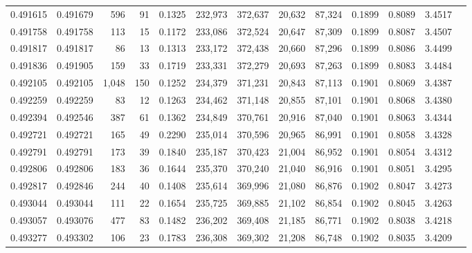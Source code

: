\begin{tabular}{rrrrrrrrrrrrr}
0.491615 & 0.491679 &   596 &    91 &                                     0.1325 & 232,973 & 372,637 &  20,632 &  87,324 & 0.1899 & 0.8089 & 3.4517 \\
0.491758 & 0.491758 &   113 &    15 &                                     0.1172 & 233,086 & 372,524 &  20,647 &  87,309 & 0.1899 & 0.8087 & 3.4507 \\
0.491817 & 0.491817 &    86 &    13 &                                     0.1313 & 233,172 & 372,438 &  20,660 &  87,296 & 0.1899 & 0.8086 & 3.4499 \\
0.491836 & 0.491905 &   159 &    33 &                                     0.1719 & 233,331 & 372,279 &  20,693 &  87,263 & 0.1899 & 0.8083 & 3.4484 \\
0.492105 & 0.492105 & 1,048 &   150 &                                     0.1252 & 234,379 & 371,231 &  20,843 &  87,113 & 0.1901 & 0.8069 & 3.4387 \\
0.492259 & 0.492259 &    83 &    12 &                                     0.1263 & 234,462 & 371,148 &  20,855 &  87,101 & 0.1901 & 0.8068 & 3.4380 \\
0.492394 & 0.492546 &   387 &    61 &                                     0.1362 & 234,849 & 370,761 &  20,916 &  87,040 & 0.1901 & 0.8063 & 3.4344 \\
0.492721 & 0.492721 &   165 &    49 &                                     0.2290 & 235,014 & 370,596 &  20,965 &  86,991 & 0.1901 & 0.8058 & 3.4328 \\
0.492791 & 0.492791 &   173 &    39 &                                     0.1840 & 235,187 & 370,423 &  21,004 &  86,952 & 0.1901 & 0.8054 & 3.4312 \\
0.492806 & 0.492806 &   183 &    36 &                                     0.1644 & 235,370 & 370,240 &  21,040 &  86,916 & 0.1901 & 0.8051 & 3.4295 \\
0.492817 & 0.492846 &   244 &    40 &                                     0.1408 & 235,614 & 369,996 &  21,080 &  86,876 & 0.1902 & 0.8047 & 3.4273 \\
0.493044 & 0.493044 &   111 &    22 &                                     0.1654 & 235,725 & 369,885 &  21,102 &  86,854 & 0.1902 & 0.8045 & 3.4263 \\
0.493057 & 0.493076 &   477 &    83 &                                     0.1482 & 236,202 & 369,408 &  21,185 &  86,771 & 0.1902 & 0.8038 & 3.4218 \\
0.493277 & 0.493302 &   106 &    23 &                                     0.1783 & 236,308 & 369,302 &  21,208 &  86,748 & 0.1902 & 0.8035 & 3.4209 \\

\end{tabular}

